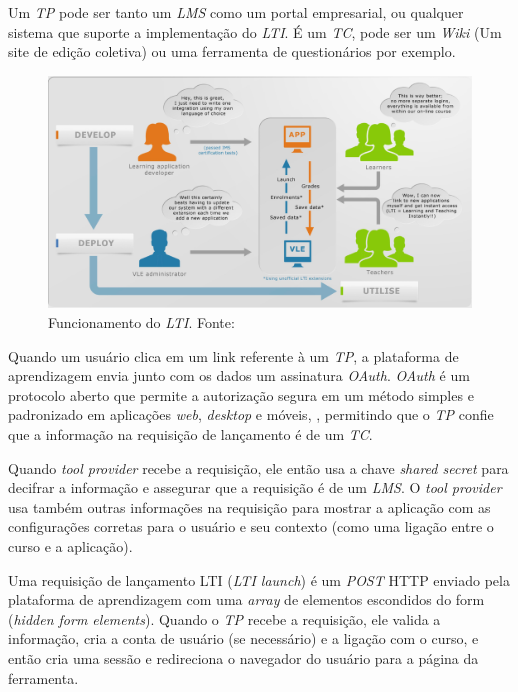 Um \textit{TP} pode ser tanto um \textit{LMS} como um portal empresarial, ou qualquer sistema que suporte a implementação do \textit{LTI}. É um \textit{TC}, pode ser um \textit{Wiki} (Um site de edição coletiva) ou uma ferramenta de questionários por exemplo.
\begin{figure}[h]
    \centering
    \label{fig:ims-lti-funcionamento}
    \includegraphics[keepaspectratio=true,scale=0.5]{figuras/ims-lti-funcionamento.png}
    \caption{Funcionamento do \textit{LTI}. Fonte: }
\end{figure}

Quando um usuário clica em um link referente à um \textit{TP}, a plataforma de aprendizagem envia junto com os dados um assinatura \textit{OAuth}. \textit{OAuth} é um protocolo aberto que permite a autorização segura em um método simples e padronizado em aplicações \textit{web}, \textit{desktop} e móveis, \cite{oauth}, permitindo que o \textit{TP} confie que a informação na requisição de lançamento é de um \textit{TC}.

Quando \textit{tool provider} recebe a requisição, ele então usa a chave \textit{shared secret} para decifrar a informação e assegurar que a requisição é de um \textit{LMS}. O \textit{tool provider} usa também outras informações na requisição para mostrar a aplicação com as configurações corretas para o usuário e seu contexto (como uma ligação entre o curso e a aplicação).

Uma requisição de lançamento LTI (\textit{LTI launch}) é um \textit{POST} \ac{HTTP} enviado pela plataforma de aprendizagem com uma \textit{array} de elementos escondidos do form (\textit{hidden form elements}). Quando o \textit{TP} recebe a requisição, ele valida a informação, cria a conta de usuário (se necessário) e a ligação com o curso, e então cria uma sessão e redireciona o navegador do usuário para a página da ferramenta.

